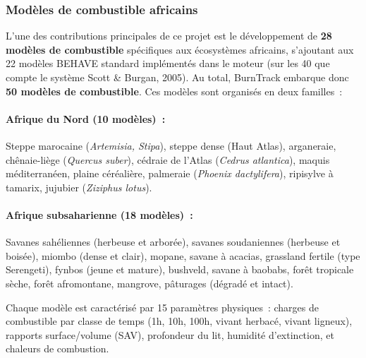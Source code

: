 \documentclass[a4paper,12pt,openany,titlepage]{scrartcl}
\begin{document}
\subsubsection{Modèles de combustible africains}

L'une des contributions principales de ce projet est le développement de \textbf{28 modèles de combustible} spécifiques aux écosystèmes africains, s'ajoutant aux 22 modèles BEHAVE standard implémentés dans le moteur (sur les 40 que compte le système Scott \& Burgan, 2005). Au total, BurnTrack embarque donc \textbf{50 modèles de combustible}. Ces modèles sont organisés en deux familles~:

\paragraph{Afrique du Nord (10 modèles)~:} Steppe marocaine (\textit{Artemisia, Stipa}), steppe dense (Haut Atlas), arganeraie, chênaie-liège (\textit{Quercus suber}), cédraie de l'Atlas (\textit{Cedrus atlantica}), maquis méditerranéen, plaine céréalière, palmeraie (\textit{Phoenix dactylifera}), ripisylve à tamarix, jujubier (\textit{Ziziphus lotus}).

\paragraph{Afrique subsaharienne (18 modèles)~:} Savanes sahéliennes (herbeuse et arborée), savanes soudaniennes (herbeuse et boisée), miombo (dense et clair), mopane, savane à acacias, grassland fertile (type Serengeti), fynbos (jeune et mature), bushveld, savane à baobabs, forêt tropicale sèche, forêt afromontane, mangrove, pâturages (dégradé et intact).

Chaque modèle est caractérisé par 15 paramètres physiques~: charges de combustible par classe de temps (1h, 10h, 100h, vivant herbacé, vivant ligneux), rapports surface/volume (SAV), profondeur du lit, humidité d'extinction, et chaleurs de combustion.
\end{document}
